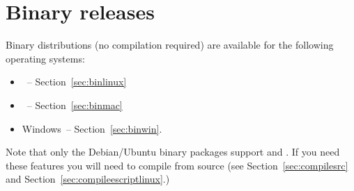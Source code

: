 %
%
%


\chapter{Binary releases}\label{chap:bin}

Binary distributions (no compilation required) are available for the following operating systems:
\begin{itemize}
 \item \linux~-- Section~\ref{sec:binlinux}
 \item \macosx~-- Section~\ref{sec:binmac}
 \item Windows~-- Section~\ref{sec:binwin}.
\end{itemize}

Note that only the Debian/Ubuntu binary packages support \openmp and \mpi.
If you need these features you will need to compile \esfinley from source (see Section~\ref{sec:compilesrc} 
and Section~\ref{sec:compileescriptlinux}.)



